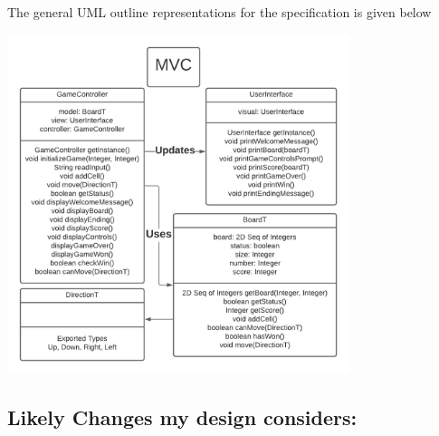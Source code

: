 \documentclass[12pt]{article}
\begin{document}
The general UML outline representations for the specification is given below

\begin{center}
    \includegraphics[width=0.75\textwidth]{UML_Diagram.png} \\
\end{center}

\newpage

\subsection*{Likely Changes my design considers:}
\end{document}
